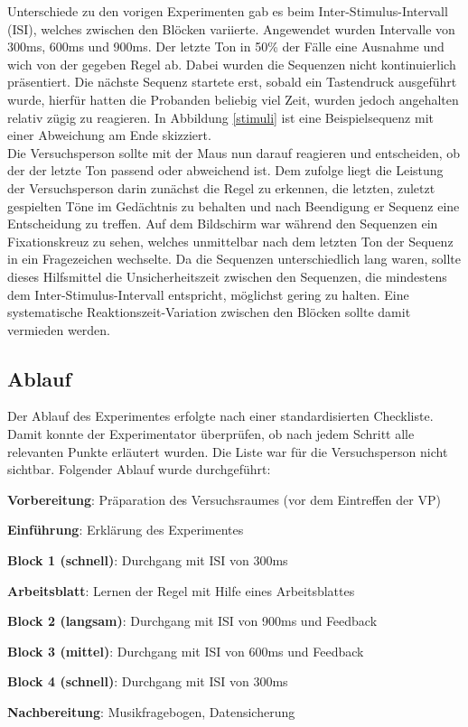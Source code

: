 \documentclass[doc,a4paper,12pt]{apa6}
\begin{document}
Unterschiede zu den vorigen Experimenten gab es beim Inter-Stimulus-Intervall (ISI), welches zwischen den Blöcken variierte. Angewendet wurden Intervalle von 300ms, 600ms und 900ms. Der letzte Ton in 50\% der Fälle eine Ausnahme und wich von der gegeben Regel ab. Dabei wurden die Sequenzen nicht kontinuierlich präsentiert. Die nächste Sequenz startete erst, sobald ein Tastendruck ausgeführt wurde, hierfür hatten die Probanden beliebig viel Zeit, wurden jedoch angehalten relativ zügig zu reagieren. In Abbildung \ref{stimuli} ist eine Beispielsequenz mit einer Abweichung am Ende skizziert.\\
Die Versuchsperson sollte mit der Maus nun darauf reagieren und entscheiden, ob der der letzte Ton passend oder abweichend ist. Dem zufolge liegt die Leistung der Versuchsperson darin zunächst die Regel zu erkennen, die letzten, zuletzt gespielten Töne im Gedächtnis zu behalten und nach Beendigung er Sequenz eine Entscheidung zu treffen. Auf dem Bildschirm war während den Sequenzen ein Fixationskreuz zu sehen, welches unmittelbar nach dem letzten Ton der Sequenz in ein Fragezeichen wechselte. Da die Sequenzen unterschiedlich lang waren, sollte dieses Hilfsmittel die Unsicherheitszeit zwischen den Sequenzen, die mindestens dem Inter-Stimulus-Intervall entspricht, möglichst gering zu halten. Eine systematische Reaktionszeit-Variation zwischen den Blöcken sollte damit vermieden werden.

\subsection{Ablauf}

Der Ablauf des Experimentes erfolgte nach einer standardisierten Checkliste. Damit konnte der Experimentator überprüfen, ob nach jedem Schritt alle relevanten Punkte erläutert wurden. Die Liste war für die Versuchsperson nicht sichtbar. Folgender Ablauf wurde durchgeführt:

\begin{compactenum}
  \item \textbf{Vorbereitung}: Präparation des Versuchsraumes (vor dem Eintreffen der VP)
  \item \textbf{Einführung}: Erklärung des Experimentes
  \item \textbf{Block 1 (schnell)}: Durchgang mit ISI von 300ms
  \item \textbf{Arbeitsblatt}: Lernen der Regel mit Hilfe eines Arbeitsblattes
  \item \textbf{Block 2 (langsam)}: Durchgang mit ISI von 900ms und Feedback
  \item \textbf{Block 3 (mittel)}: Durchgang mit ISI von 600ms und Feedback
  \item \textbf{Block 4 (schnell)}: Durchgang mit ISI von 300ms
  \item \textbf{Nachbereitung}: Musikfragebogen, Datensicherung
\end{compactenum}
\end{document}
